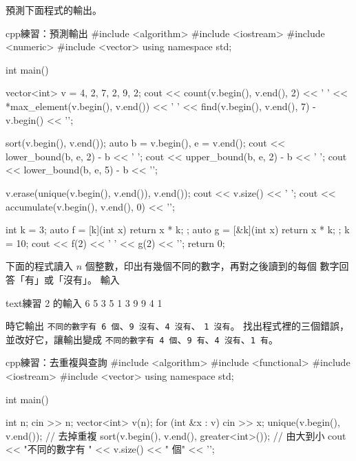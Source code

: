 \begin{drills}[label=drills:ch9]
\item 預測下面程式的輸出。
\begin{code}{cpp}{練習：預測輸出}
#include <algorithm>
#include <iostream>
#include <numeric>
#include <vector>
using namespace std;

int main() {
    vector<int> v = {4, 2, 7, 2, 9, 2};
    cout << count(v.begin(), v.end(), 2) << ' '
         << *max_element(v.begin(), v.end()) << ' '
         << find(v.begin(), v.end(), 7) - v.begin() << '\n';

    sort(v.begin(), v.end());
    auto b = v.begin(), e = v.end();
    cout << lower_bound(b, e, 2) - b << ' ';
    cout << upper_bound(b, e, 2) - b << ' ';
    cout << lower_bound(b, e, 5) - b << '\n';

    v.erase(unique(v.begin(), v.end()), v.end());
    cout << v.size() << ' ';
    cout << accumulate(v.begin(), v.end(), 0) << '\n';

    int k = 3;
    auto f = [k](int x) { return x * k; };
    auto g = [&k](int x) { return x * k; };
    k = 10;
    cout << f(2) << ' ' << g(2) << '\n';
    return 0;
}
\end{code}
\item 下面的程式讀入 $n$ 個整數，印出有幾個不同的數字，再對之後讀到的每個
數字回答「有」或「沒有」。 輸入
\begin{code}{text}{練習 2 的輸入}
6
5 3 5 1 3 9
9 4 1
\end{code}
時它輸出 \texttt{不同的數字有 6 個}、\texttt{9 沒有}、\texttt{4 沒有}、
\texttt{1 沒有}。 找出程式裡的三個錯誤，並改好它，讓輸出變成
\texttt{不同的數字有 4 個}、\texttt{9 有}、\texttt{4 沒有}、\texttt{1 有}。
\begin{code}{cpp}{練習：去重複與查詢}
#include <algorithm>
#include <functional>
#include <iostream>
#include <vector>
using namespace std;

int main() {
    int n;
    cin >> n;
    vector<int> v(n);
    for (int &x : v) {
        cin >> x;
    }
    unique(v.begin(), v.end());                  // 去掉重複
    sort(v.begin(), v.end(), greater<int>());    // 由大到小
    cout << "不同的數字有 " << v.size() << " 個" << '\n';

}
\end{code}
\end{drills}
